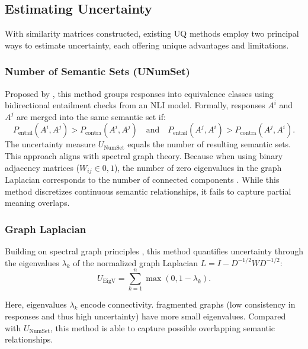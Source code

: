 \subsection{Estimating Uncertainty}
\label{subsec:estimation}
With similarity matrices constructed, existing UQ methods employ two principal ways to estimate uncertainty, each offering unique advantages and limitations.

\subsubsection{Number of Semantic Sets (UNumSet)}
\label{subsubsec:numset}
Proposed by \citet{kuhn2023semantic}, this method groups responses into equivalence classes using bidirectional entailment checks from an NLI model. Formally, responses $A^i$ and $A^j$ are merged into the same semantic set if:
\begin{equation}
P_{\text{entail}}(A^i, A^j) > P_{\text{contra}}(A^i, A^j) \quad \text{and} \quad P_{\text{entail}}(A^j, A^i) > P_{\text{contra}}(A^j, A^i).
\end{equation}
The uncertainty measure $U_{\text{NumSet}}$ equals the number of resulting semantic sets. This approach aligns with spectral graph theory. Because when using binary adjacency matrices ($W_{ij} \in {0,1}$), the number of zero eigenvalues in the graph Laplacian corresponds to the number of connected components \citep{von2007tutorial}. While this method discretizes continuous semantic relationships, it fails to capture partial meaning overlaps.

\subsubsection{Graph Laplacian}
\label{subsubsec:laplacian}
Building on spectral graph principles \citep{agaskar2013spectral,lin2023generating}, this method quantifies uncertainty through the eigenvalues ${\lambda_k}$ of the normalized graph Laplacian $L = I - D^{-1/2}WD^{-1/2}$:
\begin{equation}
U_{\text{EigV}} = \sum_{k=1}^n \max(0, 1 - \lambda_k).
\end{equation}

Here, eigenvalues $\lambda_k$ encode connectivity. fragmented graphs (low consistency in responses and thus high uncertainty) have more small eigenvalues. Compared with $U_{\text{NumSet}}$, this method is able to capture possible overlapping semantic relationships.


